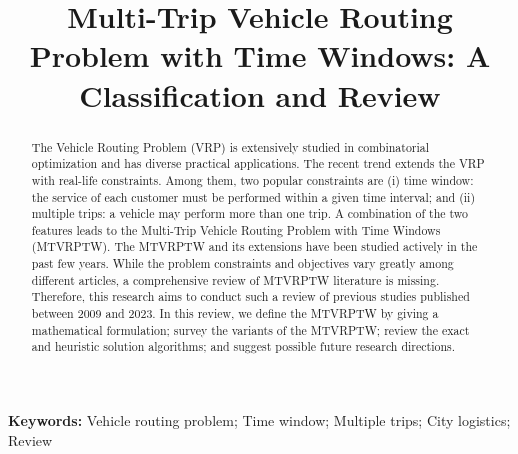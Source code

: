 \documentclass[11pt]{article}
\title{Multi-Trip Vehicle Routing Problem with Time Windows: A Classification and Review}
\begin{document}
\maketitle


\begin{abstract}
    The Vehicle Routing Problem (VRP) is extensively studied in combinatorial optimization and has diverse practical applications. The recent trend extends the VRP with real-life constraints.  Among them, two popular constraints are (i) time window: the service of each customer must be performed within a given time interval; and (ii) multiple trips: a vehicle may perform more than one trip.  A combination of the two features leads to the Multi-Trip Vehicle Routing Problem with Time Windows (MTVRPTW). The MTVRPTW and its extensions have been studied actively in the past few years.  While the problem constraints and objectives vary greatly among different articles, a comprehensive review of MTVRPTW literature is missing.  Therefore, this research aims to conduct such a review of previous studies published between 2009 and 2023.  In this review, we define the MTVRPTW by giving a mathematical formulation; survey the variants of the MTVRPTW; review the exact and heuristic solution algorithms; and suggest possible future research directions.
\end{abstract}

\textbf{Keywords:} Vehicle routing problem;
Time window;
Multiple trips;
City logistics;
Review
\maketitle










\end{document}
